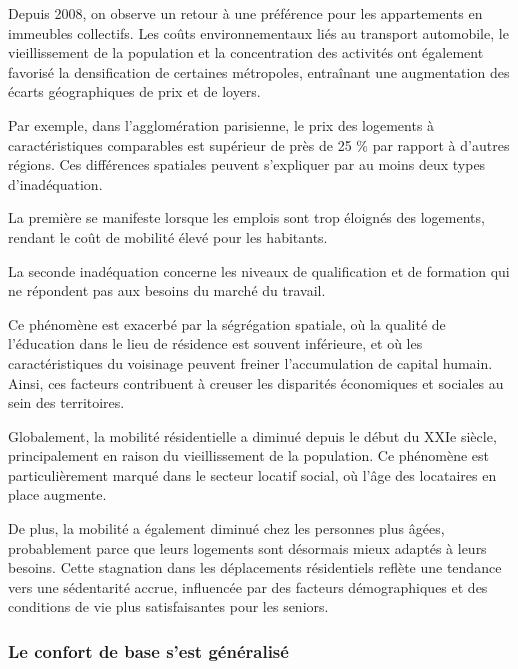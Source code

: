 \documentclass[a4paper, 12pt]{report}
\begin{document}
Depuis 2008, on observe un retour à une préférence pour les appartements en immeubles collectifs. Les coûts environnementaux liés au transport automobile, le vieillissement de la population et la concentration des activités ont également favorisé la densification de certaines métropoles, entraînant une augmentation des écarts géographiques de prix et de loyers.

Par exemple, dans l'agglomération parisienne, le prix des logements à caractéristiques comparables est supérieur de près de 25 \% par rapport à d'autres régions. Ces différences spatiales peuvent s'expliquer par au moins deux types d’inadéquation. 

La première se manifeste lorsque les emplois sont trop éloignés des logements, rendant le coût de mobilité élevé pour les habitants. 

La seconde inadéquation concerne les niveaux de qualification et de formation qui ne répondent pas aux besoins du marché du travail. 

Ce phénomène est exacerbé par la ségrégation spatiale, où la qualité de l'éducation dans le lieu de résidence est souvent inférieure, et où les caractéristiques du voisinage peuvent freiner l'accumulation de capital humain. Ainsi, ces facteurs contribuent à creuser les disparités économiques et sociales au sein des territoires.

Globalement, la mobilité résidentielle a diminué depuis le début du XXIe siècle, principalement en raison du vieillissement de la population. Ce phénomène est particulièrement marqué dans le secteur locatif social, où l'âge des locataires en place augmente. 

De plus, la mobilité a également diminué chez les personnes plus âgées, probablement parce que leurs logements sont désormais mieux adaptés à leurs besoins. Cette stagnation dans les déplacements résidentiels reflète une tendance vers une sédentarité accrue, influencée par des facteurs démographiques et des conditions de vie plus satisfaisantes pour les seniors.

\subsubsection{Le confort de base s’est généralisé}
\end{document}
